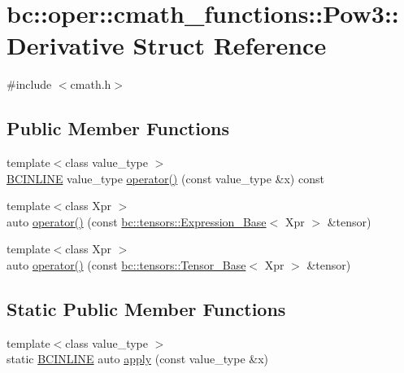 \hypertarget{structbc_1_1oper_1_1cmath__functions_1_1Pow3_1_1Derivative}{}\section{bc\+:\+:oper\+:\+:cmath\+\_\+functions\+:\+:Pow3\+:\+:Derivative Struct Reference}
\label{structbc_1_1oper_1_1cmath__functions_1_1Pow3_1_1Derivative}


{\ttfamily \#include $<$cmath.\+h$>$}

\subsection*{Public Member Functions}
\begin{DoxyCompactItemize}
\item 
{\footnotesize template$<$class value\+\_\+type $>$ }\\\hyperlink{common_8h_a6699e8b0449da5c0fafb878e59c1d4b1}{B\+C\+I\+N\+L\+I\+NE} value\+\_\+type \hyperlink{structbc_1_1oper_1_1cmath__functions_1_1Pow3_1_1Derivative_a63a4cfd6c32048239ec22205f97ab7b4}{operator()} (const value\+\_\+type \&x) const
\item 
{\footnotesize template$<$class Xpr $>$ }\\auto \hyperlink{structbc_1_1oper_1_1cmath__functions_1_1Pow3_1_1Derivative_a80b154cd4453de7540bfa11ef7b46a75}{operator()} (const \hyperlink{classbc_1_1tensors_1_1Expression__Base}{bc\+::tensors\+::\+Expression\+\_\+\+Base}$<$ Xpr $>$ \&tensor)
\item 
{\footnotesize template$<$class Xpr $>$ }\\auto \hyperlink{structbc_1_1oper_1_1cmath__functions_1_1Pow3_1_1Derivative_a034abd8ad3c8c38c3e29287e56401393}{operator()} (const \hyperlink{classbc_1_1tensors_1_1Tensor__Base}{bc\+::tensors\+::\+Tensor\+\_\+\+Base}$<$ Xpr $>$ \&tensor)
\end{DoxyCompactItemize}
\subsection*{Static Public Member Functions}
\begin{DoxyCompactItemize}
\item 
{\footnotesize template$<$class value\+\_\+type $>$ }\\static \hyperlink{common_8h_a6699e8b0449da5c0fafb878e59c1d4b1}{B\+C\+I\+N\+L\+I\+NE} auto \hyperlink{structbc_1_1oper_1_1cmath__functions_1_1Pow3_1_1Derivative_a8fd066cde3c7b6f7784b03d585d1ac1d}{apply} (const value\+\_\+type \&x)
\end{DoxyCompactItemize}


